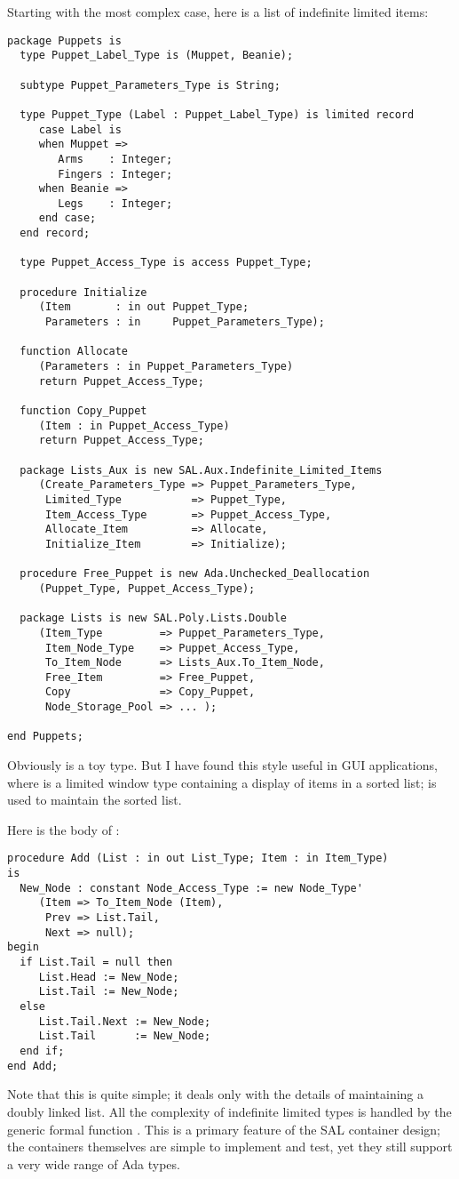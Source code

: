 \documentclass{article}
\begin{document}
Starting with the most complex case, here is a list of indefinite
limited items:
\begin{verbatim}
package Puppets is
  type Puppet_Label_Type is (Muppet, Beanie);

  subtype Puppet_Parameters_Type is String;

  type Puppet_Type (Label : Puppet_Label_Type) is limited record
     case Label is
     when Muppet =>
        Arms    : Integer;
        Fingers : Integer;
     when Beanie =>
        Legs    : Integer;
     end case;
  end record;

  type Puppet_Access_Type is access Puppet_Type;

  procedure Initialize
     (Item       : in out Puppet_Type;
      Parameters : in     Puppet_Parameters_Type);

  function Allocate 
     (Parameters : in Puppet_Parameters_Type)
     return Puppet_Access_Type;

  function Copy_Puppet
     (Item : in Puppet_Access_Type)
     return Puppet_Access_Type;

  package Lists_Aux is new SAL.Aux.Indefinite_Limited_Items
     (Create_Parameters_Type => Puppet_Parameters_Type,
      Limited_Type           => Puppet_Type,
      Item_Access_Type       => Puppet_Access_Type,
      Allocate_Item          => Allocate,
      Initialize_Item        => Initialize);

  procedure Free_Puppet is new Ada.Unchecked_Deallocation
     (Puppet_Type, Puppet_Access_Type);

  package Lists is new SAL.Poly.Lists.Double
     (Item_Type         => Puppet_Parameters_Type,
      Item_Node_Type    => Puppet_Access_Type,
      To_Item_Node      => Lists_Aux.To_Item_Node,
      Free_Item         => Free_Puppet,
      Copy              => Copy_Puppet,
      Node_Storage_Pool => ... );

end Puppets;
\end{verbatim}
Obviously  is a toy type. But I have found this
style useful in GUI applications, where  is a limited
window type containing a display of items in a sorted list;
 is used to maintain the sorted
list.

Here is the body of :
\begin{verbatim}
procedure Add (List : in out List_Type; Item : in Item_Type)
is
  New_Node : constant Node_Access_Type := new Node_Type'
     (Item => To_Item_Node (Item),
      Prev => List.Tail,
      Next => null);
begin
  if List.Tail = null then
     List.Head := New_Node;
     List.Tail := New_Node;
  else
     List.Tail.Next := New_Node;
     List.Tail      := New_Node;
  end if;
end Add;
\end{verbatim}
Note that this is quite simple; it deals only with the details of
maintaining a doubly linked list. All the complexity of indefinite
limited types is handled by the generic formal function
. This is a primary feature of the SAL container
design; the containers themselves are simple to implement and test,
yet they still support a very wide range of Ada types.
\end{document}
